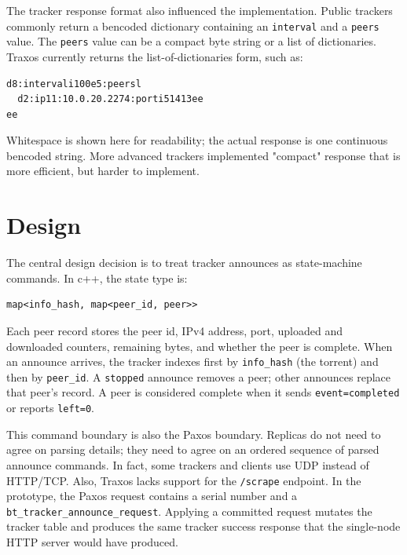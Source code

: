 \documentclass[letterpaper,twocolumn,10pt]{article}
\begin{document}
The tracker response format also influenced the implementation. Public
trackers commonly return a bencoded dictionary containing an
\texttt{interval} and a \texttt{peers} value. The \texttt{peers} value can
be a compact byte string or a list of dictionaries. Traxos currently returns
the list-of-dictionaries form, such as:

\begin{verbatim}
d8:intervali100e5:peersl
  d2:ip11:10.0.20.2274:porti51413ee
ee
\end{verbatim}

\noindent
Whitespace is shown here for readability; the actual response is one
continuous bencoded string. More advanced trackers implemented "compact"
response that is more efficient, but harder to implement.

\section{Design}

The central design decision is to treat tracker announces as state-machine
commands. In c++, the state type is:

\begin{verbatim}
map<info_hash, map<peer_id, peer>>
\end{verbatim}

\noindent
Each peer record stores the peer id, IPv4 address, port, uploaded and
downloaded counters, remaining bytes, and whether the peer is complete.
When an announce arrives, the tracker indexes first by \texttt{info\_hash} (the torrent)
and then by \texttt{peer\_id}. A \texttt{stopped} announce removes a peer;
other announces replace that peer's record. A peer is considered complete
when it sends \texttt{event=completed} or reports \texttt{left=0}.

This command boundary is also the Paxos boundary. Replicas do not need to agree
on parsing details; they need to agree on an ordered sequence of parsed
announce commands. In fact, some trackers and clients use UDP instead of
HTTP/TCP. Also, Traxos lacks support for the \texttt{/scrape} endpoint. In the
prototype, the Paxos request contains a serial number and a
\texttt{bt\_tracker\_announce\_request}. Applying a committed request mutates
the tracker table and produces the same tracker success response that the
single-node HTTP server would have produced.
\end{document}
